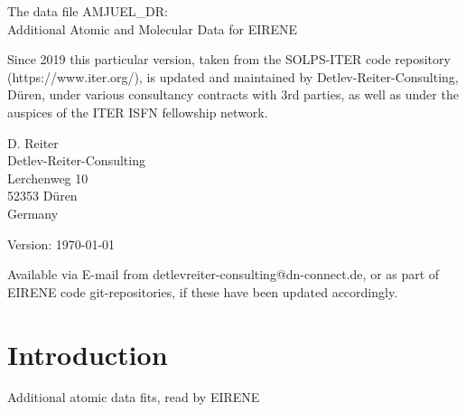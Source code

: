 \documentclass[12pt,dvipdfmx]{article}
\begin{document}
\parindent 0pt
{\LARGE \bf \center
\vspace*{3truecm}

The data file AMJUEL\_DR: \\
Additional Atomic and Molecular Data for EIRENE
}
{\large \bf \center

Since 2019 this particular version, taken from the SOLPS-ITER code repository (https://www.iter.org/),
is updated and maintained by Detlev-Reiter-Consulting, D\"uren,
under various consultancy contracts with 3rd parties,
as well as under the auspices of the ITER ISFN fellowship network.
\vspace*{3truecm}

D. Reiter \\
Detlev-Reiter-Consulting \\
Lerchenweg 10\\
52353 D\"uren \\
Germany
\vspace{3truecm}

Version: \today
\vspace{1truecm}

Available via E-mail from detlevreiter-consulting@dn-connect.de, or as part of
EIRENE code git-repositories, if these have been updated accordingly.
}
\newpage
\renewcommand\thesection{\Roman{section}}
\newpage
{}
\tableofcontents
\newpage
\section{Introduction}\label{sec-intro}

Additional atomic data fits, read by EIRENE
\end{document}
